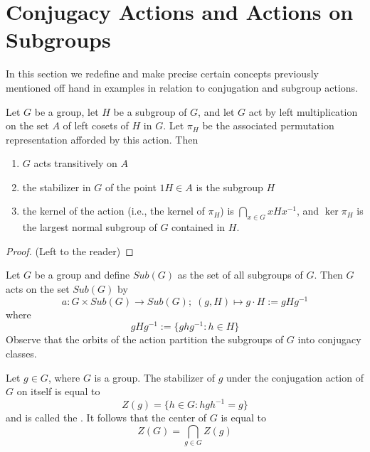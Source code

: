 \documentclass[12pt, a4paper, oneside, openright, titlepage]{book}
\begin{document}
\section{\textsection Conjugacy Actions and Actions on Subgroups}

In this section we redefine and make precise certain concepts previously mentioned off hand in examples in relation to conjugation and subgroup actions.


\begin{thm}
    Let $G$ be a group, let $H$ be a subgroup of $G$, and let $G$ act by left multiplication on the set $A$ of left cosets of $H$ in $G$. Let $\pi_H$ be the associated permutation representation afforded by this action. Then \begin{enumerate}
        \item $G$ acts transitively on $A$
        \item the stabilizer in $G$ of the point $1H \in A$ is the subgroup $H$
        \item the kernel of the action (i.e., the kernel of $\pi_H$) is $\bigcap_{x\in G}xHx^{-1}$, and $\ker \pi_H$ is the largest normal subgroup of $G$ contained in $H$.
    \end{enumerate}
\end{thm}
\begin{proof}
    (Left to the reader)
\end{proof}

\begin{defn}
    Let $G$ be a group and define $Sub(G)$ as the set of all subgroups of $G$. Then $G$ acts on the set $Sub(G)$ by \begin{equation*}
        a:G\times Sub(G)\rightarrow Sub(G);\;(g,H) \mapsto g\cdot H:= gHg^{-1}
    \end{equation*}
    where \begin{equation*}
        gHg^{-1} := \{ghg^{-1}:h \in H\}
    \end{equation*}
    Observe that the orbits of the action partition the subgroups of $G$ into conjugacy classes.
\end{defn}


\begin{defn}
    Let $g \in G$, where $G$ is a group. The stabilizer of $g$ under the conjugation action of $G$ on itself is equal to \begin{equation*}
        Z(g) = \{h \in G: hgh^{-1} = g\}
    \end{equation*}
    and is called the . It follows that the center of $G$ is equal to \begin{equation*}
        Z(G) = \bigcap\limits_{g\in G}Z(g)
    \end{equation*}
\end{defn}
\end{document}
